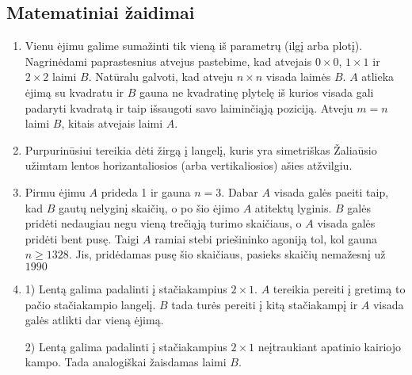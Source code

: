 \subsection*{Matematiniai žaidimai}
\begin{enumerate} 
\item 
Vienu ėjimu galime sumažinti tik vieną iš parametrų (ilgį arba plotį).
Nagrinėdami paprastesnius atvejus pastebime, kad atvejais $0\times 0$,
$1\times 1$ ir $2\times 2$ laimi $B$. Natūralu galvoti, kad atveju $n\times
n$ visada laimės $B$. $A$ atlieka ėjimą su kvadratu ir $B$ gauna ne kvadratinę
plytelę iš kurios visada gali padaryti kvadratą ir taip išsaugoti savo
laiminčiąją poziciją. Atveju $m=n$ laimi $B$, kitais atvejais laimi $A$.
\item 
Purpurinūsiui tereikia dėti žirgą į langelį, kuris yra simetriškas
Žaliaūsio užimtam lentos horizantaliosios (arba vertikaliosios) ašies
atžvilgiu. 
\item 
 Pirmu ėjimu $A$ prideda 1 ir gauna $n=3$. Dabar $A$ visada galės paeiti
 taip, kad $B$ gautų nelyginį skaičių, o po šio ėjimo $A$ atitektų
 lyginis. $B$ galės pridėti nedaugiau negu vieną trečiąją turimo
 skaičiaus, o $A$ visada galės pridėti bent pusę. Taigi $A$ ramiai stebi
 priešininko agoniją tol, kol gauna $n\geq 1328$. Jis, pridėdamas pusę šio
 skaičiaus, pasieks skaičių nemažesnį už $1990$
\item 
1) Lentą galima padalinti į stačiakampius $2\times 1$. $A$ tereikia
pereiti į gretimą to pačio stačiakampio langelį. $B$ tada turės pereiti į
kitą stačiakampį ir $A$ visada galės atlikti dar vieną ėjimą.  

2) Lentą galima padalinti į stačiakampius $2\times 1$ neįtraukiant
apatinio kairiojo kampo. Tada analogiškai žaisdamas laimi $B$.


\end{enumerate}

